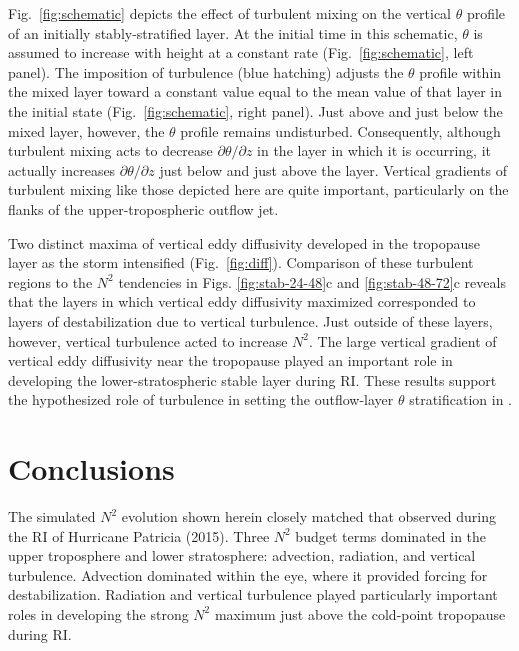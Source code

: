 Fig.~\ref{fig:schematic} depicts the effect of turbulent mixing on the vertical $\theta$ profile of an initially stably-stratified layer.
At the initial time in this schematic, $\theta$ is assumed to increase with height at a constant rate (Fig.~\ref{fig:schematic}, left panel).
The imposition of turbulence (blue hatching) adjusts the $\theta$ profile within the mixed layer toward a constant value equal to the mean value of that layer in the initial state (Fig.~\ref{fig:schematic}, right panel).
Just above and just below the mixed layer, however, the $\theta$ profile remains undisturbed.
Consequently, although turbulent mixing acts to decrease $\partial \theta/\partial z$ in the layer in which it is occurring, it actually increases $\partial \theta/\partial z$ just below and just above the layer.
Vertical gradients of turbulent mixing like those depicted here are quite important, particularly on the flanks of the upper-tropospheric outflow jet.

Two distinct maxima of vertical eddy diffusivity developed in the tropopause layer as the storm intensified (Fig.~\ref{fig:diff}).
Comparison of these turbulent regions to the $N^2$ tendencies in Figs. \ref{fig:stab-24-48}c and \ref{fig:stab-48-72}c reveals that the layers in which vertical eddy diffusivity maximized corresponded to layers of destabilization due to vertical turbulence.
Just outside of these layers, however, vertical turbulence acted to increase $N^2$.
The large vertical gradient of vertical eddy diffusivity near the tropopause played an important role in developing the lower-stratospheric stable layer during RI.
These results support the hypothesized role of turbulence in setting the outflow-layer $\theta$ stratification in \cite{RotunnoEmanuel}.

  \section{Conclusions}
The simulated $N^2$ evolution shown herein closely matched that observed during the RI of Hurricane Patricia (2015).
Three $N^2$ budget terms dominated in the upper troposphere and lower stratosphere: advection, radiation, and vertical turbulence.
Advection dominated within the eye, where it provided forcing for destabilization.
Radiation and vertical turbulence played particularly important roles in developing the strong $N^2$ maximum just above the cold-point tropopause during RI.

